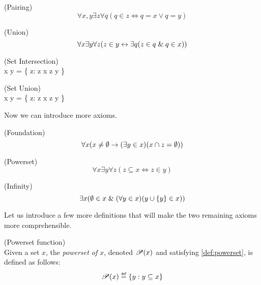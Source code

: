 \begin{definition}{(Pairing)}\label{def:pairing}
\begin{equation}
\forall x, y \exists z \forall q (q \in z \iff q = x \lor q = y) %
\end{equation}
\end{definition}

\begin{definition}{(Union)}\label{def:union}
\begin{equation}
\forall x \exists y \forall z (z \in y \iff \exists q( z \in q \et q \in x)) %
\end{equation}
\end{definition}

\begin{definition}{(Set Intersection)}\\
\beq
x \cap y = \{ z: z \in x \et z \in y \}
\eeq
\end{definition}

\begin{definition}{(Set Union)}\\
\beq
x \cup y = \{ z: z \in x \lor z \in y \}
\eeq
\end{definition}

Now we can introduce more axioms.
\begin{definition}{(Foundation)}\label{def:foundation}
\begin{equation}
\forall x (x \neq \emptyset \then (\exists y \in x) (x \cap z = \emptyset)) %
\end{equation}
\end{definition}

\begin{definition}{(Powerset)}\label{def:powerset}
\begin{equation}
\forall x \exists y \forall z (z \subseteq x \iff z \in y) %
\end{equation}
\end{definition}

\begin{definition}{(Infinity)}\label{def:infinity} %
\begin{equation}
\exists x (\emptyset \in x \mathrel{\&} (\forall y \in x)(y\cup\{y\} \in x))
\end{equation}
\end{definition}

Let us introduce a few more definitions that will make the two remaining axioms more comprehensible.
\begin{definition}{(Powerset function)}\\
Given a set $x$, the \emph{powerset of $x$}, denoted $\mathscr{P} (x)$ and satisfying \ref{def:powerset}, is defined as follows:
\begin{equation}
\power{x} \defeq \{y: y \subseteq x\}
\end{equation}
\end{definition}


